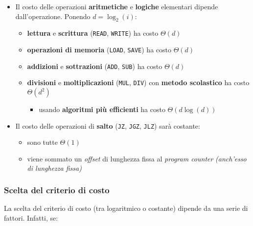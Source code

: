 \documentclass[italian, 10pt]{article}
\begin{document}
\begin{minipage}[htbp]{.99\textwidth}
  \bigskip
  \begin{itemize}
    \item Il costo delle operazioni \textbf{aritmetiche} e \textbf{logiche} elementari dipende dall'operazione. Ponendo \(d = \log_2(i)\):
          \begin{itemize}[label=\(\rightarrow\)]
            \item \textbf{lettura} e \textbf{scrittura} (\texttt{READ}, \texttt{WRITE}) ha costo \(\Theta(d)\)
            \item \textbf{operazioni di memoria} (\texttt{LOAD}, \texttt{SAVE}) ha costo \(\Theta(d)\)
            \item \textbf{addizioni} e \textbf{sottrazioni} (\texttt{ADD}, \texttt{SUB}) ha costo \(\Theta(d)\)
            \item \textbf{divisioni} e \textbf{moltiplicazioni} (\texttt{MUL}, \texttt{DIV}) con \textbf{metodo scolastico} ha costo \(\Theta(d^2)\)
                  \begin{itemize}[label=\(\rightarrow\)]
                    \item usando \textbf{algoritmi più efficienti} ha costo \(\Theta\left(d \log{(d)}\right)\)
                  \end{itemize}

          \end{itemize}
    \item Il costo delle operazioni di \textbf{salto} (\texttt{JZ}, \texttt{JGZ}, \texttt{JLZ}) sarà costante:
          \begin{itemize}[label=\(\rightarrow\)]
            \item sono tutte \(\Theta(1)\)
            \item viene sommato un \textit{offset} di lunghezza fissa al \textit{program counter} \textit{(anch'esso di lunghezza fissa)}
          \end{itemize}
  \end{itemize}
\end{minipage}

\subsubsection{Scelta del criterio di costo}

La scelta del criterio di costo (tra logaritmico o costante) dipende da una serie di fattori.
Infatti, se:
\end{document}
